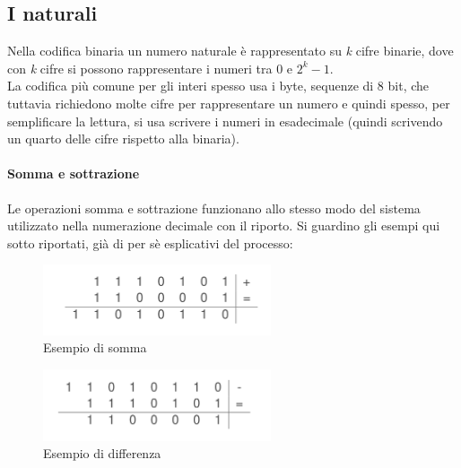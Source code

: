 \subsection{I naturali} Nella codifica binaria un numero naturale è rappresentato su \textit{k} cifre binarie, dove con \textit{k} cifre si possono rappresentare i numeri tra 0 e $2^{k}-1$.\\
La codifica più comune per gli interi spesso usa i byte, sequenze di 8 bit, che tuttavia richiedono molte cifre per rappresentare un numero e quindi spesso, per semplificare la lettura, si usa scrivere i numeri in esadecimale (quindi scrivendo un quarto delle cifre rispetto alla binaria).

\paragraph*{Somma e sottrazione}
Le operazioni somma e sottrazione funzionano allo stesso modo del sistema utilizzato nella numerazione decimale con il riporto. Si guardino gli esempi qui sotto riportati, già di per sè esplicativi del processo:\\
\begin{figure}[H]
	\centering
	\includegraphics[width=0.6\textwidth,keepaspectratio]{images/Somma-Bin.png}
	\caption{Esempio di somma}
\end{figure}

\begin{figure}[H]
	\centering
	\includegraphics[width=0.6\textwidth,keepaspectratio]{images/Sottrazione-Bin.png}
	\caption{Esempio di differenza}
\end{figure}

